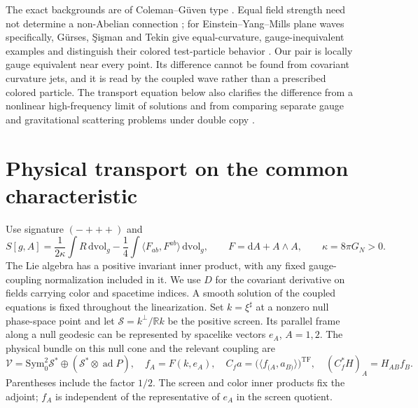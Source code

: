 \documentclass[11pt]{article}
\newcommand{\dd}{\mathrm d}
\newcommand{\TF}{\mathrm{TF}}
\newcommand{\ad}{\operatorname{ad}}
\newcommand{\vol}{\mathrm{vol}}
\begin{document}
The exact backgrounds are of Coleman--G\"uven type \cite{coleman,guven}. Equal field strength need not determine a non-Abelian connection \cite{dw}; for Einstein--Yang--Mills plane waves specifically, G\"urses, \c{S}i\c{s}man and Tekin give equal-curvature, gauge-inequivalent examples and distinguish their colored test-particle behavior \cite[Sec.~IV]{gst}. Our pair is locally gauge equivalent near every point. Its difference cannot be found from covariant curvature jets, and it is read by the coupled wave rather than a prescribed colored particle. The transport equation below also clarifies the difference from a nonlinear high-frequency limit of solutions and from comparing separate gauge and gravitational scattering problems under double copy \cite{sandwich}.

\section{Physical transport on the common characteristic}

Use signature \((-+++)\) and
\[
 S[g,A]=\frac1{2\kappa}\int R\,\dd\vol_g
       -\frac14\int \langle F_{ab},F^{ab}\rangle\,\dd\vol_g,\qquad
 F=\dd A+A\wedge A,\qquad \kappa=8\pi G_N>0.
\]
The Lie algebra has a positive invariant inner product, with any fixed gauge-coupling normalization included in it. We use \(D\) for the covariant derivative on fields carrying color and spacetime indices. A smooth solution of the coupled equations is fixed throughout the linearization. Set \(k=\xi^\sharp\) at a nonzero null phase-space point and let \(\mathcal S=k^\perp/\mathbb R k\) be the positive screen. Its parallel frame along a null geodesic can be represented by spacelike vectors \(e_A\), \(A=1,2\). The physical bundle on this null cone and the relevant coupling are
\begin{equation}\label{eq:bundle}
 \mathcal V=\mathrm{Sym}^2_0\mathcal S^*
               \oplus(\mathcal S^*\otimes\ad P),\quad
 f_A=F(k,e_A),\quad
 C_f a=\big(\langle f_{(A},a_{B)}\rangle\big)^{\TF},\quad
 (C_f^*H)_A=H_{AB}f_B .
\end{equation}
Parentheses include the factor \(1/2\). The screen and color inner products fix the adjoint; \(f_A\) is independent of the representative of \(e_A\) in the screen quotient.
\end{document}
